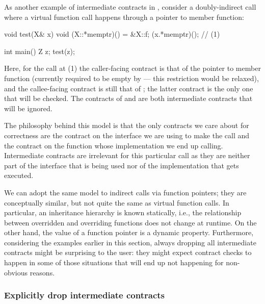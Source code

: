As another example of intermediate contracts in \cite{P2900R8}, consider a doubly-indirect call where a virtual function call happens through a pointer to member function:
\begin{codeblock}
void test(X& x) {
  void (X::*memptr)() = &X::f;
  (x.*memptr)();  // (1)
}

int main() {
  Z z;
  test(z);
}
\end{codeblock}
Here, for the call at (1) the caller-facing contract is that of the pointer to member function (currently required to be empty by \cite{P2900R8} --- this restriction would be relaxed), and the callee-facing contract is still that of  ; the latter contract is the only one that will be checked. The contracts of  and  are both intermediate contracts that will be ignored.

The philosophy behind this model is that the only contracts we care about for correctness are the contract on the interface we are using to make the call and the contract on the function whose implementation we end up calling. Intermediate contracts are irrelevant for this particular call as they are neither part of the  interface that is being used nor of the implementation that gets executed.

We can adopt the same model to indirect calls via function pointers; they are conceptually similar, but not quite the same as virtual function calls. In particular, an inheritance hierarchy is known statically, i.e., the relationship between overridden and overriding functions does not change at runtime. On the other hand, the value of a function pointer is a dynamic property. Furthermore, considering the examples earlier in this section, always dropping all intermediate contracts might be surprising to the user: they might expect contract checks to happen in some of those situations that will end up not happening for non-obvious reasons.


\subsubsection{Explicitly drop intermediate contracts}

